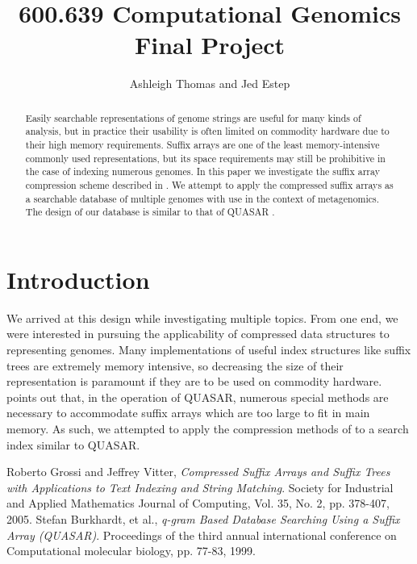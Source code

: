 \documentclass{article}
\begin{document}
\title{600.639 Computational Genomics\\
Final Project}
\date{}
\author{Ashleigh Thomas and Jed Estep}
\maketitle

\begin{abstract}
Easily searchable representations of genome strings are useful for many kinds of analysis, but in practice their usability is often limited on commodity hardware due to their high memory requirements. Suffix arrays are one of the least memory-intensive commonly used representations, but its space requirements may still be prohibitive in the case of indexing numerous genomes. In this paper we investigate the suffix array compression scheme described in \cite{GV05}. We attempt to apply the compressed suffix arrays as a searchable database of multiple genomes with use in the context of metagenomics. The design of our database is similar to that of QUASAR \cite{B99}.
\end{abstract}
\section{Introduction}
We arrived at this design while investigating multiple topics. From one end, we were interested in pursuing the applicability of compressed data structures to representing genomes. Many implementations of useful index structures like suffix trees are extremely memory intensive, so decreasing the size of their representation is paramount if they are to be used on commodity hardware. \cite{B99} points out that, in the operation of QUASAR, numerous special methods are necessary to accommodate suffix arrays which are too large to fit in main memory. As such, we attempted to apply the compression methods of \cite{GV05} to a search index similar to QUASAR.\\


\begin{thebibliography}{1}
	Roberto Grossi and Jeffrey Vitter,
	\emph{Compressed Suffix Arrays and Suffix Trees with Applications to Text Indexing and String Matching}.
	Society for Industrial and Applied Mathematics Journal of Computing,
	Vol. 35, No. 2, pp. 378-407,
	2005.
	Stefan Burkhardt, et al.,
	\emph{q-gram Based Database Searching Using a Suffix Array (QUASAR)}.
	Proceedings of the third annual international conference on Computational molecular biology,
	pp. 77-83,
	1999.
\end{thebibliography}
\end{document}
